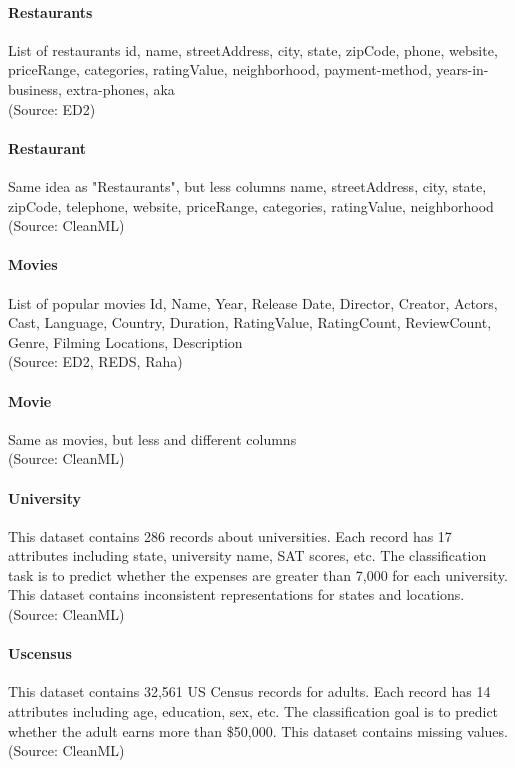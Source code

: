 \paragraph{Restaurants}
List of restaurants
id, name, streetAddress, city, state, zipCode, phone, website, priceRange, categories, ratingValue, neighborhood, payment-method, years-in-business, extra-phones, aka
\\(Source: ED2)

\paragraph{Restaurant}
Same idea as "Restaurants", but less columns
name, streetAddress, city, state, zipCode, telephone, website, priceRange, categories, ratingValue, neighborhood
\\(Source: CleanML)

\paragraph{Movies}
List of popular movies
Id, Name, Year, Release Date, Director, Creator, Actors, Cast, Language, Country, Duration, RatingValue, RatingCount, ReviewCount, Genre, Filming Locations, Description
\\(Source: ED2, REDS, Raha)

\paragraph{Movie}
Same as movies, but less and different columns
\\(Source: CleanML)

\paragraph{University}
This dataset contains 286 records about universities. Each record has 17 attributes including state, university name,
SAT scores, etc. The classification task is to predict whether the expenses are greater than 7,000 for each university. This dataset contains inconsistent representations for states and locations.
\\(Source: CleanML)

\paragraph{Uscensus}
This dataset contains 32,561 US Census records
for adults. Each record has 14 attributes including age, education, sex, etc. The classification goal is to predict whether the adult earns more than \$50,000. This dataset contains missing values.
\\(Source: CleanML)

